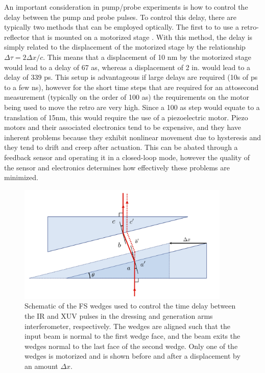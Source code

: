 An important consideration in pump/probe experiments is how to control the delay between the pump and probe pulses.  To control this delay, there are typically two methods that can be employed optically.  The first to to use a retro-reflector that is mounted on a motorized stage \cite{jagerAttosecondTransientAbsorption2018, jagerAttosecondTransientAbsorption2017, bellTransientAbsorptionSpectroscopy2013, jiangChargeCarrierDynamics2015, borjaElectronDynamicsSolids2016, chengAttoseondTransientAbsorption2015}.  With this method, the delay is simply related to the displacement of the motorized stage by the relationship $\Delta\tau = 2\Delta x/c$.  This means that a displacement of 10 nm by the motorized stage would lead to a delay of 67 as, whereas a displacement of 2 in. would lead to a delay of 339 ps. This setup is advantageous if large delays are required (10s of ps to a few ns), however for the short time steps that are required for an attosecond measurement (typically on the order of 100 as) the requirements on the motor being used to move the retro are very high.  Since a 100 as step would equate to a translation of 15nm, this would require the use of a piezoelectric motor.  Piezo motors and their associated electronics tend to be expensive, and they have inherent problems because they exhibit nonlinear movement due to hysteresis and they tend to drift and creep after actuation.  This can be abated through a feedback sensor and operating it in a closed-loop mode, however the quality of the sensor and electronics determines how effectively these problems are minimized.

\begin{figure}
	\centering
	\includegraphics[width=0.9\textwidth]{figures/Beamline/wedge_calibration.pdf}
	\caption{Schematic of the FS wedges used to control the time delay between the IR and XUV pulses in the dressing and generation arms interferometer, respectively. The wedges are aligned such that the input beam is normal to the first wedge face, and the beam exits the wedges normal to the last face of the second wedge.  Only one of the wedges is motorized and is shown before and after a displacement by an amount $\Delta x$.}
	\label{fig:wedges}
\end{figure}

